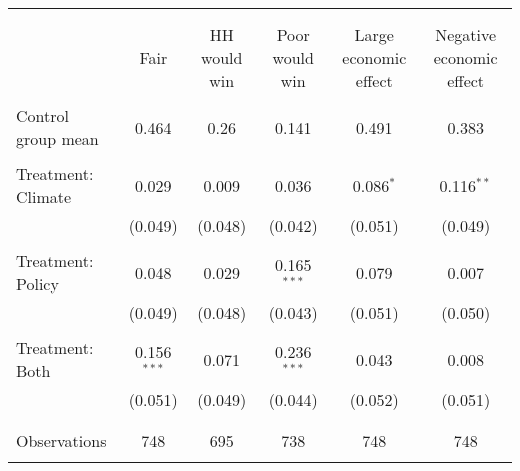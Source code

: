 
\begin{tabular}{@{\extracolsep{5pt}}lccccc} 
\\[-1.8ex]\hline 
\hline \\[-1.8ex] 
\\[-1.8ex] & Fair & HH would win & Poor would win & Large economic effect & Negative economic effect \\ 
\hline \\[-1.8ex] 
 Control group mean & 0.464 & 0.26 & 0.141 & 0.491 & 0.383  \\ \hline \\[-1.8ex] Treatment: Climate & 0.029 & 0.009 & 0.036 & 0.086$^{*}$ & 0.116$^{**}$ \\ 
  & (0.049) & (0.048) & (0.042) & (0.051) & (0.049) \\ 
  & & & & & \\ 
 Treatment: Policy & 0.048 & 0.029 & 0.165$^{***}$ & 0.079 & 0.007 \\ 
  & (0.049) & (0.048) & (0.043) & (0.051) & (0.050) \\ 
  & & & & & \\ 
 Treatment: Both & 0.156$^{***}$ & 0.071 & 0.236$^{***}$ & 0.043 & 0.008 \\ 
  & (0.051) & (0.049) & (0.044) & (0.052) & (0.051) \\ 
  & & & & & \\ 
\hline \\[-1.8ex] 

Observations & 748 & 695 & 738 & 748 & 748 \\ 
\hline 
\hline \\[-1.8ex] 
\end{tabular} 